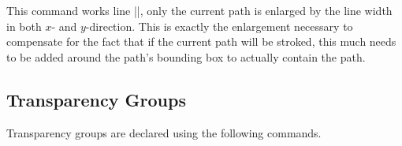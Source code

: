 \begin{command}{\pgfsetfadingforcurrentpathstroked{}}
    This command works line |\pgfsetfadingforcurrentpath|, only the current
    path is enlarged by the line width in both $x$- and $y$-direction. This is
    exactly the enlargement necessary to compensate for the fact that if the
    current path will be stroked, this much needs to be added around the path's
    bounding box to actually contain the path.
\begin{codeexample}[preamble={\pgfdeclarehorizontalshading{shading}{100bp}
{ color(0pt)=(transparent!0);    color(25bp)=(transparent!0);
  color(75bp)=(transparent!100); color(100bp)=(transparent!100)}
%
\pgfdeclarefading{fading}{\pgfuseshading{shading}}}]
\end{codeexample}
\end{command}


\subsection{Transparency Groups}

Transparency groups are declared using the following commands.

